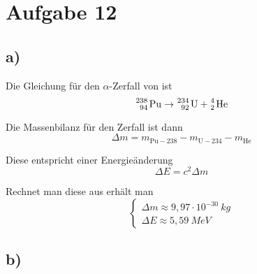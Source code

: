 \documentclass[12pt]{article}
\begin{document}
\section{Aufgabe 12}

\subsection{a)}

Die Gleichung für den $\alpha$-Zerfall von  ist
\begin{equation*}
    \ce{^{238}_{94} Pu} \rightarrow \ce{^{234}_{92} U} + \ce{^4_2 He}
\end{equation*}

Die Massenbilanz für den Zerfall ist dann
\begin{equation*}
    \Delta m = m_{\text{Pu}-238} - m_{\text{U}-234} - m_{\text{He}}
\end{equation*} 

Diese entspricht einer Energieänderung
\begin{equation*}
    \Delta E = c^2 \Delta m
\end{equation*}

Rechnet man diese aus erhält man
\begin{equation*}
    \begin{cases}
        \Delta m \approx 9,97 \cdot 10^{-30} \ \si{kg} \\
        \Delta E \approx 5,59 \ \si{MeV}
    \end{cases}  
\end{equation*}

\subsection{b)}
\end{document}
